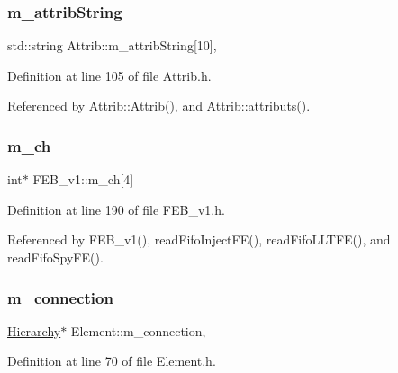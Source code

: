 \subsubsection{\texorpdfstring{m\+\_\+attrib\+String}{m\_attribString}}
{\footnotesize\ttfamily std\+::string Attrib\+::m\+\_\+attrib\+String\mbox{[}10\mbox{]}\hspace{0.3cm}{\ttfamily [protected]}, {\ttfamily [inherited]}}



Definition at line 105 of file Attrib.\+h.



Referenced by Attrib\+::\+Attrib(), and Attrib\+::attributs().

\mbox{\label{classFEB__v1_a383c35f10769b16c6a719494594899c6}} 
\subsubsection{\texorpdfstring{m\+\_\+ch}{m\_ch}}
{\footnotesize\ttfamily int$\ast$ F\+E\+B\+\_\+v1\+::m\+\_\+ch\mbox{[}4\mbox{]}\hspace{0.3cm}{\ttfamily [private]}}



Definition at line 190 of file F\+E\+B\+\_\+v1.\+h.



Referenced by F\+E\+B\+\_\+v1(), read\+Fifo\+Inject\+F\+E(), read\+Fifo\+L\+L\+T\+F\+E(), and read\+Fifo\+Spy\+F\+E().

\mbox{\label{classElement_abe3de7a5dbbc9a6dd2d7e012e5fdb266}} 
\subsubsection{\texorpdfstring{m\+\_\+connection}{m\_connection}}
{\footnotesize\ttfamily \hyperlink{classHierarchy}{Hierarchy}$\ast$ Element\+::m\+\_\+connection\hspace{0.3cm}{\ttfamily [protected]}, {\ttfamily [inherited]}}



Definition at line 70 of file Element.\+h.



